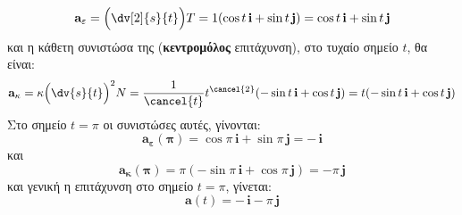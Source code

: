 \documentclass[a4paper,table]{report}
\begin{document}
\begin{solution}
\begin{enumerate}[i)]
      \[
        \mathbf{a_{\varepsilon}} = \Bigl(\dv[2]{s}{t}\Bigr)T = 1 (\cos{t} \, \mathbf{i}+
        \sin{t} \, \mathbf{j}) = \cos{t} \, \mathbf{i} + \sin{t} \, \mathbf{j}
      \] 
      και η κάθετη συνιστώσα της (\textbf{κεντρομόλος} επιτάχυνση), στο τυχαίο σημείο 
      $t$, θα είναι:
      \[
        \mathbf{a_{\kappa}} = \kappa \Bigl(\dv{s}{t} \Bigr)^2 N = \frac{1}{\cancel{t}}
        t^{\cancel{2}}
        (- \sin{t} \, \mathbf{i} + \cos{t} \, \mathbf{j}) = t (- \sin{t} \, \mathbf{i} + \cos{t} \, \mathbf{j})
      \] 
      Στο σημείο $ t= \pi $ οι συνιστώσες αυτές, γίνονται:
      \[
        \mathbf{a_{\varepsilon}(\pi)} = \cos{\pi} \, \mathbf{i} + \sin{\pi} \, \mathbf{j}
        = - \, \mathbf{i}
      \] 
      και 
      \[
        \mathbf{a_{\kappa}(\pi)} = \pi (- \sin{\pi} \, \mathbf{i} + \cos{\pi} \,
        \mathbf{j}) = - \pi \, \mathbf{j}
      \] 
      και γενική η επιτάχυνση στο σημείο $ t = \pi $, γίνεται:
      \[
        \mathbf{a}(t) = - \, \mathbf{i} - \pi \, \mathbf{j}  
      \] 
  \end{enumerate}
\end{solution}
\end{document}
